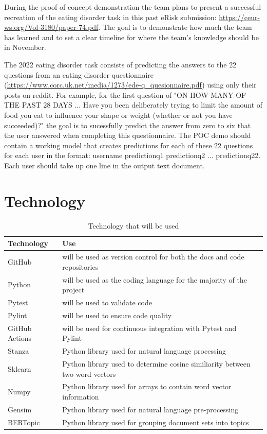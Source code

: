 \documentclass{article}
\begin{document}
During the proof of concept demonstration the team plans to present a successful recreation of the eating disorder task in this past eRisk submission: \url{https://ceur-ws.org/Vol-3180/paper-74.pdf}. The goal is to demonstrate how much the team has learned and to set a clear timeline for where the team's knowledge should be in November. 

The 2022 eating disorder task consists of predicting the answers to the 22 questions from an eating disorder questionnaire (\url{https://www.corc.uk.net/media/1273/ede-q_quesionnaire.pdf}) using only their posts on reddit. For example, for the first question of 
"ON HOW MANY OF THE PAST 28 DAYS ... Have you been deliberately trying to limit the amount of food you eat to influence your shape or weight (whether or not you have succeeded)?" the goal is to sucessfully predict the answer 
from zero to six that the user answered when completing this questionnaire. The POC demo should contain a working model
 that creates predictions for each of these 22 questions for each user in the format: username predictionq1 
 predictionq2 ... predictionq22. Each user should take up one line in the output text document.

\section{Technology}

\begin{table}[hp]
	\caption{Technology that will be used} \label{TblTechnology}
	\begin{tabularx}{\textwidth}{llX}
	\toprule
	\textbf{Technology} & \textbf{Use}\\
	\midrule
	GitHub & will be used as version control for both the docs and code repositories\\
	Python & will be used as the coding language for the majority of the project\\
	Pytest & will be used to validate code\\
	Pylint & will be used to ensure code quality\\
	GitHub Actions & will be used for continuous integration with Pytest and Pylint\\
	Stanza & Python library used for natural language processing\\
  Sklearn & Python library used to determine cosine similiarity between two word vectors\\
  Numpy & Python library used for arrays to contain word vector information\\
  Gensim & Python library used for natural language pre-processing\\
	BERTopic & Python library used for grouping document sets into topics\\
  \bottomrule
	\end{tabularx}
\end{table}
\end{document}
